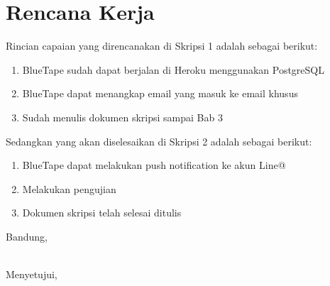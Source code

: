 \documentclass[a4paper,twoside]{article}
\begin{document}
\section{Rencana Kerja}
Rincian capaian yang direncanakan di Skripsi 1 adalah sebagai berikut:
\begin{enumerate}
\item BlueTape sudah dapat berjalan di Heroku menggunakan PostgreSQL
\item BlueTape dapat menangkap email yang masuk ke email khusus
\item Sudah menulis dokumen skripsi sampai Bab 3
\end{enumerate}

Sedangkan yang akan diselesaikan di Skripsi 2 adalah sebagai berikut:
\begin{enumerate}
\item BlueTape dapat melakukan push notification ke akun Line@
\item Melakukan pengujian
\item Dokumen skripsi telah selesai ditulis
\end{enumerate}

\vspace{1cm}
\centering Bandung, \tanggal\\
\vspace{2cm} \nama \\ 
\vspace{1cm}

\newpage

Menyetujui, \\
\end{document}
